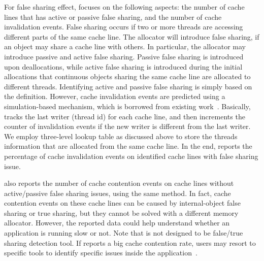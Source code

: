
For false sharing effect, \MP{} focuses on the following aspects: the number of cache lines that has active or passive false sharing, and the number of cache invalidation events. False sharing occurs if two or more threads are accessing different parts of the same cache line. The allocator will introduce false sharing, if an object may share a cache line with others. In particular, the allocator may introduce passive and active false sharing. Passive false sharing is introduced upon deallocations, while active false sharing is introduced during the initial allocations that continuous objects sharing the same cache line are allocated to different threads. Identifying active and passive false sharing is simply based on the definition. However, cache invalidation events are predicted using a simulation-based mechanism, which is borrowed from existing work~\cite{Cheetah}. Basically, \MP{} tracks the last writer (thread id) for each cache line, and then increments the counter of invalidation events if the new writer is different from the last writer. 
 We employ three-level lookup table as discussed above to store the threads information that are allocated from the same cache line. 
In the end, \MP{} reports the percentage of cache invalidation events on identified cache lines with false sharing issue. 

\MP{} also reports the number of cache contention events on cache lines without active/passive false sharing issues, using the same method. In fact, cache contention events on these cache lines can be caused by internal-object false sharing or true sharing, but they cannot be solved with a different memory allocator. However, the reported data could help understand whether an application is running slow or not. Note that \MP{} is not designed to be false/true sharing detection tool. If \MP{} reports a big cache contention rate, users may resort to specific tools to identify specific issues inside the application~\cite{Sheriff, Predator, DBLP:conf/ppopp/ChabbiWL18}. 
   

